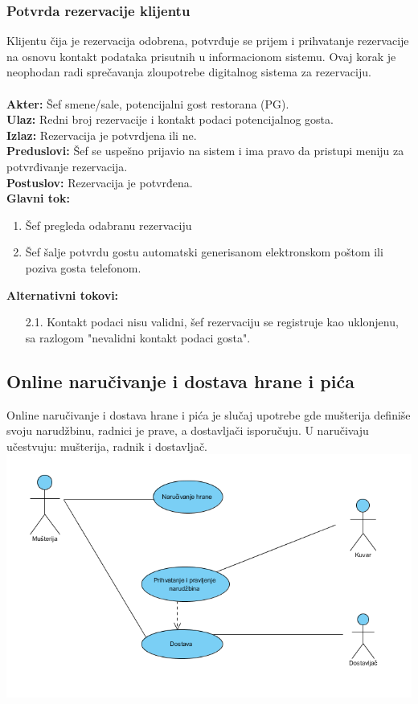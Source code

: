 \documentclass{article}
\begin{document}
\subsubsection{Potvrda rezervacije klijentu}
Klijentu čija je rezervacija odobrena, potvrđuje se prijem i prihvatanje rezervacije na osnovu kontakt podataka prisutnih u informacionom sistemu. Ovaj korak je neophodan radi sprečavanja zloupotrebe digitalnog sistema za rezervaciju.\\\\
\textbf{Akter:} Šef smene/sale, potencijalni gost restorana (PG).\\
\textbf{Ulaz:} Redni broj rezervacije i kontakt podaci potencijalnog gosta.\\
\textbf{Izlaz:} Rezervacija je potvrdjena ili ne.\\
\textbf{Preduslovi:} Šef se uspešno prijavio na sistem i ima pravo da pristupi meniju za potvrđivanje rezervacija.\\
\textbf{Postuslov:} Rezervacija je potvrđena.\\
\textbf{Glavni tok:}
\begin{enumerate}
\item Šef pregleda odabranu rezervaciju
\item Šef šalje potvrdu gostu automatski generisanom elektronskom poštom ili poziva gosta telefonom.\\
\end{enumerate}
\textbf{Alternativni tokovi:}\\
\begin{itemize}
\item [2.1.] Kontakt podaci nisu validni, šef rezervaciju se  registruje kao uklonjenu, sa razlogom "nevalidni kontakt podaci gosta".
\end{itemize}
  

\subsection{Online naručivanje i dostava hrane i pića}
Online naručivanje i dostava hrane i pića je slučaj upotrebe gde mušterija definiše svoju narudžbinu, radnici je prave, a dostavljači isporučuju. U naručivaju učestvuju: mušterija, radnik i dostavljač.
\\
\includegraphics[width=\linewidth]{SU_6_dostava.png}
\end{document}
